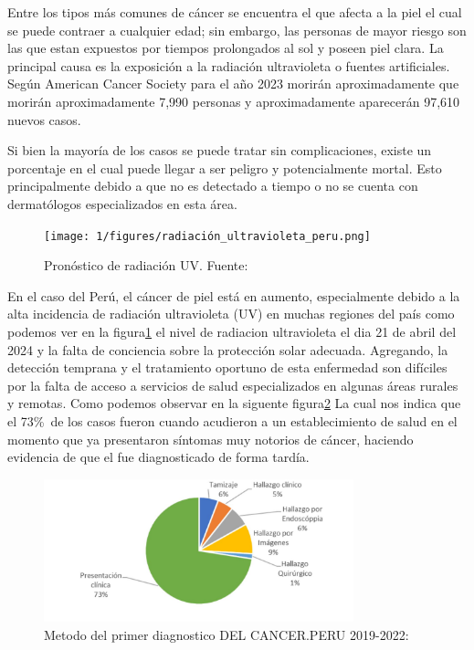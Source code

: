 Entre los tipos más comunes de cáncer se encuentra el que afecta a la piel el cual se puede contraer a cualquier edad; sin embargo, las personas de mayor riesgo son las que estan expuestos por tiempos prolongados al sol y poseen piel clara. La principal causa es la exposición a la radiación ultravioleta o fuentes artificiales. Según American Cancer Society para el año 2023 morirán aproximadamente que morirán aproximadamente 7,990 personas y aproximadamente aparecerán 97,610 nuevos casos.

Si bien la mayoría de los casos se puede tratar sin complicaciones, existe un porcentaje en el cual puede llegar a ser peligro y potencialmente mortal. Esto principalmente debido a que no es detectado a tiempo o no se cuenta con dermatólogos especializados en esta área.

\begin{figure}[h]
	\begin{center}
		\texttt{[image: 1/figures/radiación\_ultravioleta\_peru.png]}
		\caption{Pronóstico de radiación UV. Fuente: \cite{SENAMHI_uv}}
		\label{1:fig1}
	\end{center}
\end{figure}



En el caso del Perú, el cáncer de piel está en aumento, especialmente debido a la alta incidencia de radiación ultravioleta (UV) en muchas regiones del país como podemos ver en la figura\ref{1:fig1} el nivel de radiacion ultravioleta el dia 21 de abril del 2024 \parencite{SENAMHI_uv}  y la falta de conciencia sobre la protección solar adecuada. Agregando, la detección temprana y el tratamiento oportuno de esta enfermedad son difíciles por la falta de acceso a servicios de salud especializados en algunas áreas rurales y remotas. Como podemos observar en la siguente figura\ref{1:fig2} La cual nos indica que el 73\%\ de los casos fueron cuando acudieron a un establecimiento de salud en el momento que ya presentaron síntomas muy notorios de cáncer, haciendo evidencia de que el fue diagnosticado de forma tardía. \parencite{cancer_diagnostico}



\begin{figure}[h]
	\begin{center}
		\includegraphics[width=0.8\textwidth]{1/figures/cancer_diagnostico.JPG}
		\caption{Metodo del primer diagnostico DEL CANCER.PERU 2019-2022: \cite{cancer_diagnostico}}
		\label{1:fig2}
	\end{center}
\end{figure}







